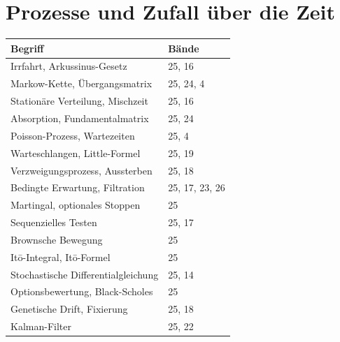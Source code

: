 \section*{Prozesse und Zufall über die Zeit}
\nopagebreak
{\small\renewcommand{\arraystretch}{1.32}
\begin{longtable}{@{}P{5.6cm}P{2.8cm}@{}}
\toprule
\textbf{Begriff} & \textbf{Bände}\\
\midrule
\endhead
Irrfahrt, Arkussinus-Gesetz & 25, 16\\
Markow-Kette, Übergangsmatrix & 25, 24, 4\\
Stationäre Verteilung, Mischzeit & 25, 16\\
Absorption, Fundamentalmatrix & 25, 24\\
Poisson-Prozess, Wartezeiten & 25, 4\\
Warteschlangen, Little-Formel & 25, 19\\
Verzweigungsprozess, Aussterben & 25, 18\\
Bedingte Erwartung, Filtration & 25, 17, 23, 26\\
Martingal, optionales Stoppen & 25\\
Sequenzielles Testen & 25, 17\\
Brownsche Bewegung & 25\\
Itō-Integral, Itō-Formel & 25\\
Stochastische Differentialgleichung & 25, 14\\
Optionsbewertung, Black-Scholes & 25\\
Genetische Drift, Fixierung & 25, 18\\
Kalman-Filter & 25, 22\\
\bottomrule
\end{longtable}}

